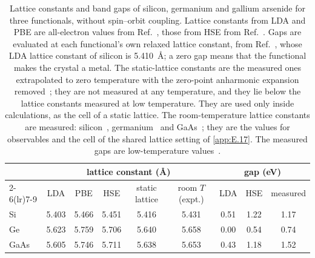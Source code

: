 \begin{table}[t]
  \centering
  \caption{Lattice constants and band gaps of silicon, germanium and gallium arsenide for three functionals, without spin--orbit coupling. Lattice constants from LDA and PBE are all-electron values from Ref.~\cite[Table~II]{csonka2009assessing}, those from HSE from Ref.~\cite[Table~I]{lucero2012improved}. Gaps are evaluated at each functional's own relaxed lattice constant, from Ref.~\cite[Table~I]{lucero2012improved}, whose LDA lattice constant of silicon is \SI{5.410}{\angstrom}; a zero gap means that the functional makes the crystal a metal. The static-lattice constants are the measured ones extrapolated to zero temperature with the zero-point anharmonic expansion removed~\cite[Table~II]{csonka2009assessing}; they are not measured at any temperature, and they lie below the lattice constants measured at low temperature. They are used only inside calculations, as the cell of a static lattice. The room-temperature lattice constants are measured: silicon~\cite[lattice parameter of silicon]{mohr2025codata}, germanium~\cite[Sect.~II\,A]{rideau2006strained} and GaAs~\cite{vurgaftman2001band}; they are the values for observables and the cell of the shared lattice setting of \cref{app:E.17}. The measured gaps are low-temperature values~\cite[Table~I]{lucero2012improved}.}
  \label{tab:E-functionals}
  \begin{tabular}{l ccccc ccc}
    \toprule
    & \multicolumn{5}{c}{lattice constant (\AA)} & \multicolumn{3}{c}{gap (eV)} \\
    \cmidrule(lr){2-6}\cmidrule(lr){7-9}
    & LDA & PBE & HSE & static lattice & room $T$ (expt.) & LDA & HSE & measured \\
    \midrule
    Si   & 5.403 & 5.466 & 5.451 & 5.416 & 5.431 & 0.51 & 1.22 & 1.17 \\
    Ge   & 5.623 & 5.759 & 5.706 & 5.640 & 5.658 & 0.00 & 0.54 & 0.74 \\
    GaAs & 5.605 & 5.746 & 5.711 & 5.638 & 5.653 & 0.43 & 1.18 & 1.52 \\
    \bottomrule
  \end{tabular}
\end{table}

